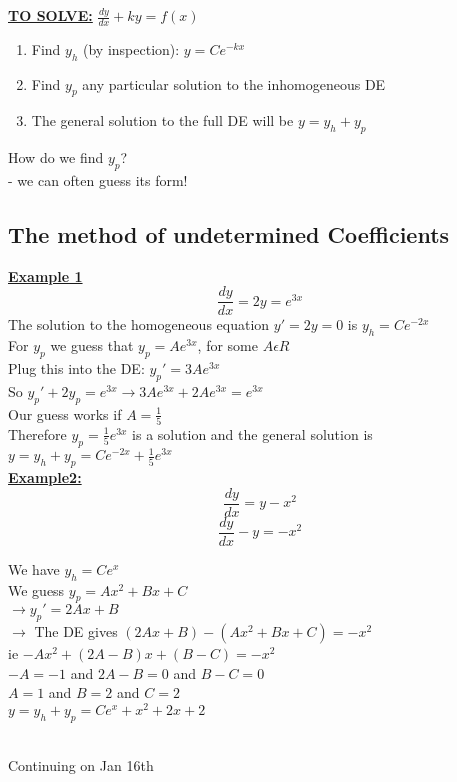 \documentclass[12pt]{article}
\newcommand{\myt}[1]{\textbf{\underline{#1}}}
\begin{document}
	\myt{TO SOLVE:} $\frac{dy}{dx} + ky = f(x)$\\
	\begin{enumerate}
		\item Find $y_h$ (by inspection): $y = Ce^{-kx}$
		\item Find $y_p$ any particular solution to the inhomogeneous DE
		\item The general solution to the full DE will be $y = y_h + y_p$
	\end{enumerate}

	How do we find $y_p$?\\
	- we can often guess its form!\\
	
	\subsection*{The method of undetermined Coefficients}
	\myt{Example 1}\\
	$$\frac{dy}{dx} = 2y = e^{3x}$$
	The solution to the homogeneous equation $y' = 2y = 0$ is $y_h = Ce^{-2x}$\\
	For $y_p$ we guess that $y_p = Ae^{3x}$, for some $A \epsilon R$\\
	Plug this into the DE: $y_p' = 3Ae^{3x}$\\
	So $y_p' + 2y_p = e^{3x} \rightarrow 3Ae^{3x} + 2Ae^{3x} = e^{3x}$\\
	Our guess works if $A = \frac{1}{5}$\\
	Therefore $y_p = \frac{1}{5}e^{3x}$ is a solution and the general solution is $y = y_h + y_p = Ce^{-2x} + \frac{1}{5}e^{3x}$\\
	
	\myt{Example2:}\\
	$$\frac{dy}{dx} = y - x^2$$
	$$\frac{dy}{dx} - y = -x^2$$
	
	We have $y_h = Ce^x$\\
	We guess $y_p = Ax^2 + Bx + C$\\
	$\rightarrow y_p' = 2Ax + B$\\
	$\rightarrow$ The DE gives $(2Ax + B) - (Ax^2 + Bx + C) = -x^2$\\
	ie $-Ax^2 + (2A - B)x + (B-C) = -x^2$\\
	$-A = -1$ and $2A-B = 0$ and $B-C = 0$\\
	$A = 1$ and $B = 2$ and $C = 2$\\
	$y = y_h + y_p = Ce^x + x^2 + 2x + 2$\\\
	
	Continuing on Jan 16th\\
	
\end{document}

